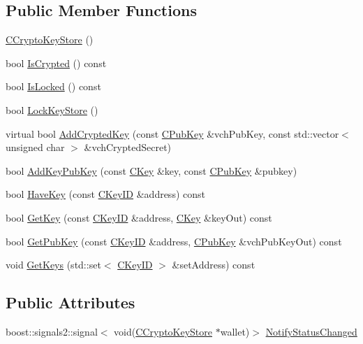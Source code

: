 \subsection*{Public Member Functions}
\begin{DoxyCompactItemize}
\item 
\hyperlink{class_c_crypto_key_store_a7c7f1075182d42fcb0781d1dc7a876c3}{C\+Crypto\+Key\+Store} ()
\item 
bool \hyperlink{class_c_crypto_key_store_a1cb434078a9ea686c0acf168d2c81252}{Is\+Crypted} () const 
\item 
bool \hyperlink{class_c_crypto_key_store_a1c3ebef555fd13676d67509b95820fcf}{Is\+Locked} () const 
\item 
bool \hyperlink{class_c_crypto_key_store_ad967b2232dc6a2a8aef7a723296b44dc}{Lock\+Key\+Store} ()
\item 
virtual bool \hyperlink{class_c_crypto_key_store_a9f4d2df95008205b2b9784c5f0e8e12b}{Add\+Crypted\+Key} (const \hyperlink{class_c_pub_key}{C\+Pub\+Key} \&vch\+Pub\+Key, const std\+::vector$<$ unsigned char $>$ \&vch\+Crypted\+Secret)
\item 
bool \hyperlink{class_c_crypto_key_store_a340109b8673267676a34664a76ed3274}{Add\+Key\+Pub\+Key} (const \hyperlink{class_c_key}{C\+Key} \&key, const \hyperlink{class_c_pub_key}{C\+Pub\+Key} \&pubkey)
\item 
bool \hyperlink{class_c_crypto_key_store_a0cefe933dd3a6ac7744432493696bffc}{Have\+Key} (const \hyperlink{class_c_key_i_d}{C\+Key\+I\+D} \&address) const 
\item 
bool \hyperlink{class_c_crypto_key_store_a58cfb3c490318ef82de8fc9be6637269}{Get\+Key} (const \hyperlink{class_c_key_i_d}{C\+Key\+I\+D} \&address, \hyperlink{class_c_key}{C\+Key} \&key\+Out) const 
\item 
bool \hyperlink{class_c_crypto_key_store_abd897aff07ec5679235b14cb4485dc37}{Get\+Pub\+Key} (const \hyperlink{class_c_key_i_d}{C\+Key\+I\+D} \&address, \hyperlink{class_c_pub_key}{C\+Pub\+Key} \&vch\+Pub\+Key\+Out) const 
\item 
void \hyperlink{class_c_crypto_key_store_a4f13246f58b7edbaf125d603f7d0d4b4}{Get\+Keys} (std\+::set$<$ \hyperlink{class_c_key_i_d}{C\+Key\+I\+D} $>$ \&set\+Address) const 
\end{DoxyCompactItemize}
\subsection*{Public Attributes}
\begin{DoxyCompactItemize}
\item 
boost\+::signals2\+::signal$<$ void(\hyperlink{class_c_crypto_key_store}{C\+Crypto\+Key\+Store} $\ast$wallet)$>$ \hyperlink{class_c_crypto_key_store_a251b9ed228a19ab39d542985b425fc85}{Notify\+Status\+Changed}
\end{DoxyCompactItemize}

